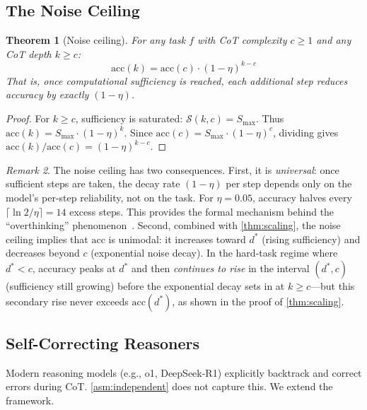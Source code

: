 \documentclass{article}
\newtheorem{theorem}{Theorem}
\theoremstyle{definition}
\theoremstyle{remark}
\newtheorem{remark}[theorem]{Remark}
\newcommand{\depth}{d^*}       %
\newcommand{\noise}{\eta}      %
\newcommand{\acc}{\mathrm{acc}} %
\newcommand{\suf}{\mathcal{S}} %
\newcommand{\Smax}{S_{\max}}   %
\begin{document}
\subsection{The Noise Ceiling}
\label{sec:noise-ceiling}

\begin{theorem}[Noise ceiling]
\label{thm:noise-ceiling}
For any task $f$ with CoT complexity $c \geq 1$ and any CoT depth $k \geq c$:
\[
\acc(k) = \acc(c) \cdot (1-\noise)^{k - c}
\]
That is, once computational sufficiency is reached, each additional step reduces accuracy by exactly $(1 - \noise)$.
\end{theorem}

\begin{proof}
For $k \geq c$, sufficiency is saturated: $\suf(k, c) = \Smax$. Thus $\acc(k) = \Smax \cdot (1-\noise)^k$. Since $\acc(c) = \Smax \cdot (1-\noise)^c$, dividing gives $\acc(k)/\acc(c) = (1-\noise)^{k-c}$.
\end{proof}

\begin{remark}
The noise ceiling has two consequences. First, it is \emph{universal}: once sufficient steps are taken, the decay rate $(1-\noise)$ per step depends only on the model's per-step reliability, not on the task. For $\noise = 0.05$, accuracy halves every $\lceil\ln 2 / \noise\rceil = 14$ excess steps. This provides the formal mechanism behind the ``overthinking'' phenomenon~\cite{hassid2025overthink}. Second, combined with \cref{thm:scaling}, the noise ceiling implies that $\acc$ is unimodal: it increases toward $\depth$ (rising sufficiency) and decreases beyond $c$ (exponential noise decay). In the hard-task regime where $\depth < c$, accuracy peaks at $\depth$ and then \emph{continues to rise} in the interval $(\depth, c)$ (sufficiency still growing) before the exponential decay sets in at $k \geq c$---but this secondary rise never exceeds $\acc(\depth)$, as shown in the proof of \cref{thm:scaling}.
\end{remark}

\subsection{Self-Correcting Reasoners}
\label{sec:self-correction}

Modern reasoning models (e.g., o1, DeepSeek-R1) explicitly backtrack and correct errors during CoT. \cref{asm:independent} does not capture this. We extend the framework.
\end{document}
